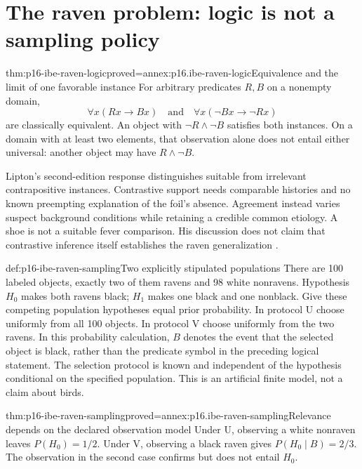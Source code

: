 \section{The raven problem: logic is not a sampling policy}
\label{sec:p16-ibe-ravens}

\begin{hbtheorem}{thm:p16-ibe-raven-logic}{proved=annex:p16.ibe-raven-logic}{Equivalence and the limit of one favorable instance}
For arbitrary predicates \(R,B\) on a nonempty domain,
\[
 \forall x(Rx\to Bx)\quad\text{and}\quad
 \forall x(\neg Bx\to\neg Rx)
\]
are classically equivalent. An object with \(\neg R\land\neg B\)
satisfies both instances. On a domain with at least two elements, that
observation alone does not entail either universal: another object may
have \(R\land\neg B\).
\end{hbtheorem}

Lipton's second-edition response distinguishes suitable from irrelevant
contrapositive instances. Contrastive support needs comparable histories
and no known preempting explanation of the foil's absence. Agreement
instead varies suspect background conditions while retaining a credible
common etiology. A shoe is not a suitable fever comparison. His discussion
does not claim that contrastive inference itself establishes the raven
generalization \cite[pp.~95--101]{Lipton2004BestExplanation}.

\begin{hbdefinition}{def:p16-ibe-raven-sampling}{Two explicitly stipulated populations}
There are 100 labeled objects, exactly two of them ravens and 98 white
nonravens. Hypothesis \(H_0\) makes both ravens black; \(H_1\) makes one
black and one nonblack. Give these competing population hypotheses equal
prior probability. In protocol U choose uniformly from all 100 objects.
In protocol V choose uniformly from the two ravens. In this probability
calculation, \(B\) denotes the event that the selected object is black,
rather than the predicate symbol in the preceding logical statement.
The selection protocol
is known and independent of the hypothesis conditional on the specified
population. This is an artificial finite model, not a claim about birds.
\end{hbdefinition}

\begin{hbtheorem}{thm:p16-ibe-raven-sampling}{proved=annex:p16.ibe-raven-sampling}{Relevance depends on the declared observation model}
Under U, observing a white nonraven leaves \(P(H_0)=1/2\).
Under V, observing a black raven gives \(P(H_0\mid B)=2/3\).
The observation in the second case confirms but does not entail \(H_0\).
\end{hbtheorem}

